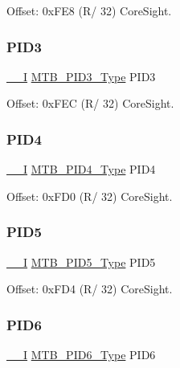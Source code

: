Offset\+: 0x\+F\+E8 (R/ 32) Core\+Sight. 

\mbox{\label{struct_mtb_ae73f57938758cfb4af7c0dc724f28f38}} 
\subsubsection{\texorpdfstring{PID3}{PID3}}
{\footnotesize\ttfamily \mbox{\hyperlink{core__cm0plus_8h_af63697ed9952cc71e1225efe205f6cd3}{\+\_\+\+\_\+I}} \mbox{\hyperlink{union_m_t_b___p_i_d3___type}{M\+T\+B\+\_\+\+P\+I\+D3\+\_\+\+Type}} P\+I\+D3}



Offset\+: 0x\+F\+EC (R/ 32) Core\+Sight. 

\mbox{\label{struct_mtb_aca0f469f6cb244e65524831bed87a5b6}} 
\subsubsection{\texorpdfstring{PID4}{PID4}}
{\footnotesize\ttfamily \mbox{\hyperlink{core__cm0plus_8h_af63697ed9952cc71e1225efe205f6cd3}{\+\_\+\+\_\+I}} \mbox{\hyperlink{union_m_t_b___p_i_d4___type}{M\+T\+B\+\_\+\+P\+I\+D4\+\_\+\+Type}} P\+I\+D4}



Offset\+: 0x\+F\+D0 (R/ 32) Core\+Sight. 

\mbox{\label{struct_mtb_ae9166eb394032edca3031ce2bd2cd5a7}} 
\subsubsection{\texorpdfstring{PID5}{PID5}}
{\footnotesize\ttfamily \mbox{\hyperlink{core__cm0plus_8h_af63697ed9952cc71e1225efe205f6cd3}{\+\_\+\+\_\+I}} \mbox{\hyperlink{union_m_t_b___p_i_d5___type}{M\+T\+B\+\_\+\+P\+I\+D5\+\_\+\+Type}} P\+I\+D5}



Offset\+: 0x\+F\+D4 (R/ 32) Core\+Sight. 

\mbox{\label{struct_mtb_a493aeb34689360563c695b1f9ab2d958}} 
\subsubsection{\texorpdfstring{PID6}{PID6}}
{\footnotesize\ttfamily \mbox{\hyperlink{core__cm0plus_8h_af63697ed9952cc71e1225efe205f6cd3}{\+\_\+\+\_\+I}} \mbox{\hyperlink{union_m_t_b___p_i_d6___type}{M\+T\+B\+\_\+\+P\+I\+D6\+\_\+\+Type}} P\+I\+D6}



